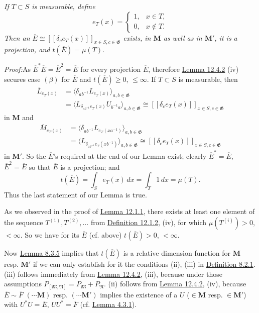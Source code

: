 \documentclass[12pt,b5paper,twoside]{article}
\newcommand{\M}{\mathbf M}
\newcommand{\Proof}{\par\noindent\textit{Proof:}\enspace}
\newcommand{\defref}[1]{\hyperref[def:#1]{Definition #1}}
\newcommand{\lemref}[1]{\hyperref[lem:#1]{Lemma #1}}
\begin{document}
\emph{If $T\subset S$ is measurable, define}
\[
 e_T(x)=\begin{cases}
  1,&x\in T,\\
  0,&x\notin T.
 \end{cases}
\]
\emph{Then an $\overline E\cong
[[\delta_ce_T(x)]]_{x\in S,c\in\mathfrak G}$ exists, in $\M$ as well as in
$\M'$, it is a projection, and $t(\overline E)=\mu(T)$.}

\Proof As $\overline E^*\overline E=\overline E^2=\overline E$ for every
projection $\overline E$, therefore \lemref{12.4.2} (iv) secures case
$(\beta)$ for
$\overline E$ and $t(\overline E)\geq0$, $\leq\infty$. If $T\subset S$ is
measurable, then
\begin{align*}
 \overline L_{e_T(x)}
 &=\langle\delta_{ab^{-1}}L_{e_T(x)}\rangle_{a,b\in\mathfrak G}\\
 &=\langle L_{\delta_{ab^{-1}}e_T(x)}U_{b^{-1}a}
\rangle_{a,b\in\mathfrak G}
 \cong[[\delta_ce_T(x)]]_{x\in S,c\in\mathfrak G}
\end{align*}
in $\M$ and
\begin{align*}
 \overline M_{e_T(x)}
 &=\langle\delta_{ab^{-1}}L_{e_T(xa^{-1})}\rangle_{a,b\in\mathfrak G}\\
 &=\langle L_{\delta_{ab^{-1}}e_T(xb^{-1})}\rangle_{a,b\in\mathfrak G}
 \cong[[\delta_ce_T(x)]]_{x\in S,c\in\mathfrak G}
\end{align*}
in $\M'$. So the $\overline E$'s required at the end of our Lemma exist;
clearly $\overline E^*=\overline E$, $\overline E^2=\overline E$ so that
$\overline E$ is a projection; and
\[
 t(\overline E)=\int_Se_T(x)\,dx=\int_T1\,dx=\mu(T).
\]
Thus the last statement of our Lemma is true.

As we observed in the proof of \lemref{12.1.1}, there exists at least one
element of the sequence $T^{(1)},T^{(2)},\ldots$ from \defref{12.1.2}, (iv),
for which $\mu(T^{(i)})>0$, $<\infty$. So we have for its $\overline E$
(cf. above) $t(\overline E)>0$, $<\infty$.

Now \lemref{8.3.5} implies that $t(\overline E)$ is a relative dimension
function for $\M$ resp. $\M'$ if we can only establish for it the conditions
(ii), (iii) in \defref{8.2.1}. (iii) follows immediately from
\lemref{12.4.2}, (iii), because under those assumptions
$P_{[\mathfrak M,\mathfrak N]}=P_{\mathfrak M}+P_{\mathfrak N}$. (ii)
follows from \lemref{12.4.2}, (iv), because
$\overline E\sim\overline F$ $(\cdots\M)$ resp. $(\cdots\M')$ implies the
existence of a $U$ ($\in\M$ resp. $\in\M'$) with
$U^*U=\overline E$, $UU^*=\overline F$ (cf. \lemref{4.3.1}).
\end{document}
